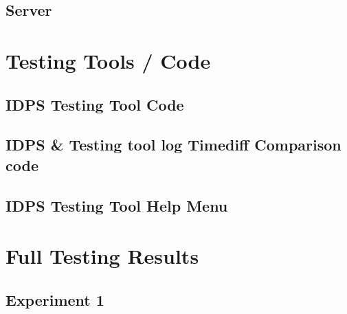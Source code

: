 \documentclass[12pt, oneside]{book}
\begin{document}
\subsection{Server}



\section{Testing Tools / Code}
\subsection{IDPS Testing Tool Code}

\subsection{IDPS \& Testing tool log Timediff Comparison code}

\subsection{IDPS Testing Tool Help Menu}




\section{Full Testing Results}
\subsection{Experiment 1}
\label{app:Exp1}
\end{document}
